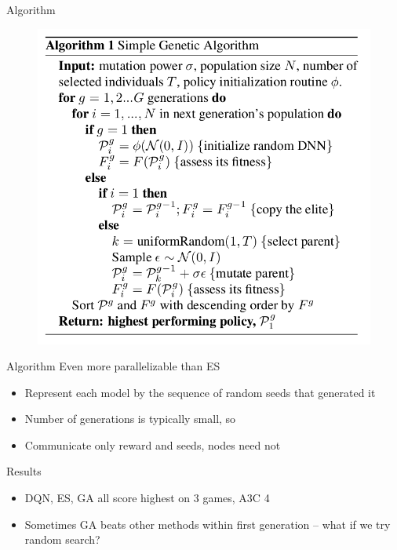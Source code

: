 \documentclass{beamer}
\begin{document}
	\begin{frame}{Algorithm}
		\begin{figure}
			\centering
			\includegraphics[height=0.7\textheight]{deep_ga_algorithm.png}
			\label{fig4}
		\end{figure}
	\end{frame}
	
	\begin{frame}{Algorithm}
		Even more parallelizable than ES
		\begin{itemize}
			\item Represent each model by the sequence of random seeds that generated it
			\item Number of generations is typically small, so
			\item Communicate only reward and seeds, nodes need not
		\end{itemize}
	\end{frame}
	
	\begin{frame}{Results}
		\begin{itemize}
			\item DQN, ES, GA all score highest on 3 games, A3C 4
			\item Sometimes GA beats other methods within first generation -- what if we try random search?
		\end{itemize}
	\end{frame}
	
\end{document}
